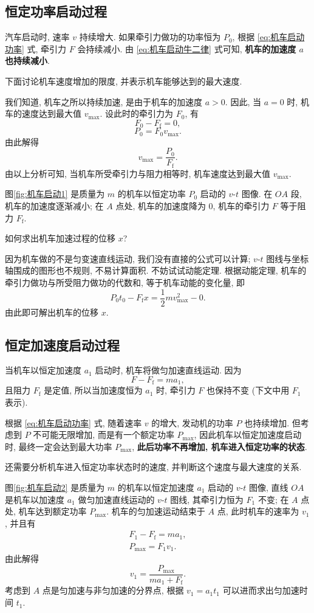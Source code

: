 \documentclass[UTF8,openany,fontset=fandol]{ctexbook}
\theoremstyle{chinesetextbook}
\begin{document}
\subsection*{恒定功率启动过程}
汽车启动时, 速率 $v$ 持续增大. 如果牵引力做功的功率恒为 $P_0$, 根据 \eqref{eq:机车启动功率} 式, 牵引力 $F$ 会持续减小. 由 \eqref{eq:机车启动牛二律} 式可知, \textbf{机车的加速度 $a$ 也持续减小}.

{\kaishu 下面讨论机车速度增加的限度, 并表示机车能够达到的最大速度.}

我们知道, 机车之所以持续加速, 是由于机车的加速度 $a>0$. 因此, 当 $a=0$ 时, 机车的速度达到最大值 $v_\text{max}$. 设此时的牵引力为 $F_0$, 有
\[
F_0-F_\mathrm{f}=0,
\]
\label{eq:恒定功率启动的牛二律}
\[
P_0=F_0v_\mathrm{max}.
\]
由此解得
\begin{equation}\label{eq:最大速度}
v_\mathrm{max}=\frac{P_0}{F_\mathrm{f}}.
\end{equation}
由以上分析可知, 当机车所受牵引力与阻力相等时, 机车速度达到最大值 $v_\mathrm{max}$.

图\ref{fig:机车启动1} 是质量为 $m$ 的机车以恒定功率 $P_0$ 启动的 $v$-$t$ 图像. 在 $OA$ 段, 机车的加速度逐渐减小; 在 $A$ 点处, 机车的加速度降为 0, 机车的牵引力 $F$ 等于阻力 $F_\mathrm{f}$.

{\kaishu 如何求出机车加速过程的位移 $x$?}

因为机车做的不是匀变速直线运动, 我们没有直接的公式可以计算; $v$-$t$ 图线与坐标轴围成的图形也不规则, 不易计算面积. 不妨试试动能定理. 根据动能定理, 机车的牵引力做功与所受阻力做功的代数和, 等于机车动能的变化量, 即
\[
P_0t_0-F_\mathrm{f}x=\frac12 m v_\mathrm{max}^2-0.
\]
由此即可解出机车的位移 $x$.
\subsection*{恒定加速度启动过程}
当机车以恒定加速度 $a_1$ 启动时, 机车将做匀加速直线运动. 因为
\[
F-F_\mathrm{f}=ma_1,
\]
且阻力 $F_\mathrm{f}$ 是定值, 所以当加速度恒为 $a_1$ 时, 牵引力 $F$ 也保持不变 (下文中用 $F_1$ 表示).

根据 \eqref{eq:机车启动功率} 式, 随着速率 $v$ 的增大, 发动机的功率 $P$ 也持续增加. 但考虑到 $P$ 不可能无限增加, 而是有一个额定功率 $P_\mathrm{max}$, 因此机车以恒定加速度启动时, 最终一定会达到最大功率 $P_\mathrm{max}$, \textbf{此后功率不再增加, 机车进入恒定功率的状态}.

{\kaishu 还需要分析机车进入恒定功率状态时的速度, 并判断这个速度与最大速度的关系.}

图\ref{fig:机车启动2} 是质量为 $m$ 的机车以恒定加速度 $a_1$ 启动的 $v$-$t$ 图像, 直线 $OA$ 是机车以加速度 $a_1$ 做匀加速直线运动的 $v$-$t$ 图线, 其牵引力恒为 $F_1$ 不变; 在 $A$ 点处, 机车达到额定功率 $P_\mathrm{max}$. 机车的匀加速运动结束于 $A$ 点, 此时机车的速率为 $v_1$, 并且有
\[
\begin{gathered}
F_1-F_\mathrm{f}=ma_1,\\
P_\mathrm{max}=F_1v_1.
\end{gathered}
\]
由此解得
\[
v_1=\frac{P_\mathrm{max}}{ma_1+F_\mathrm{f}}.
\]
考虑到 $A$ 点是匀加速与非匀加速的分界点, 根据 $v_1=a_1t_1$ 可以进而求出匀加速时间 $t_1$.
\end{document}
